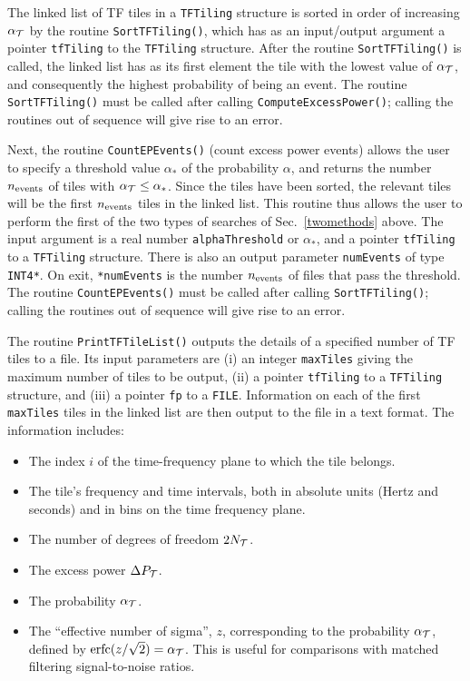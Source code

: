 \documentclass{article}
\begin{document}
The linked list of TF tiles in a \verb+TFTiling+ structure is
sorted in order of increasing $\alpha_{\cal T}$ by the routine
\verb+SortTFTiling()+, which has as an input/output argument a pointer
\verb+tfTiling+ to the \verb+TFTiling+ structure.  After the routine
\verb+SortTFTiling()+ is called, the linked list has as its first
element the tile with the lowest value of $\alpha_{\cal T}$, and
consequently the highest probability of being an event.
The routine \verb+SortTFTiling()+ must be called
after calling \verb+ComputeExcessPower()+; calling the routines out of
sequence will give rise to an error.


Next, the routine \verb+CountEPEvents()+ (count excess power events)
allows the user to specify a 
threshold value $\alpha_*$ of the probability $\alpha$, and returns
the number $n_{\rm events}$ of tiles with $\alpha_{\cal T} \le
\alpha_*$.  Since the tiles have been sorted, the relevant tiles will
be the first $n_{\rm events}$ tiles in the linked list.  This routine
thus allows the user to perform the first of the two types of searches
of Sec.\ \ref{twomethods} above.  The input argument is a real number
\verb+alphaThreshold+ or $\alpha_*$, and a pointer \verb+tfTiling+ to
a \verb+TFTiling+ structure.  There is also an output parameter
\verb+numEvents+ of type \verb+INT4*+.  On exit, \verb+*numEvents+ is
the number $n_{\rm events}$ of files that pass the threshold. 
The routine \verb+CountEPEvents()+ must be called
after calling \verb+SortTFTiling()+; calling the routines out of 
sequence will give rise to an error.

The routine \verb+PrintTFTileList()+ outputs the details of a specified
number of TF tiles to a file.  Its input parameters are (i) an integer
\verb+maxTiles+ giving the maximum number of tiles to be output, (ii)
a pointer 
\verb+tfTiling+ to a \verb+TFTiling+ structure, and (iii) a pointer
\verb+fp+ to a \verb+FILE+.  Information on each of the first
\verb+maxTiles+ tiles in the linked list are then output to the file
in a text format.  The information includes:
\begin{itemize}

\item The index $i$ of the time-frequency plane
to which the tile belongs.

\item The tile's frequency and time intervals, both in absolute units
(Hertz and seconds) and in bins on the time frequency plane.

\item The number of degrees of freedom $2 N_{\cal T}$.

\item The excess power $\Delta P_{\cal T}$.

\item The probability $\alpha_{\cal T}$.  

\item The ``effective number of sigma'', $z$, corresponding to the
probability $\alpha_{\cal T}$, defined by ${\rm erfc}(z/\sqrt{2}) =
\alpha_{\cal T}$.  This is useful for comparisons with matched
filtering signal-to-noise ratios.

\end{itemize}
\end{document}
